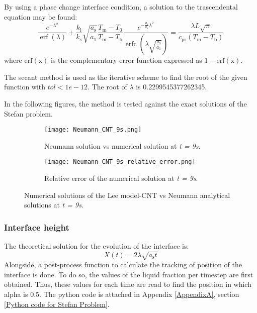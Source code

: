 By using a phase change interface condition, a solution to the trascendental equation may be found:
\begin{equation}
	\frac{e^{-\lambda^{2}}}{\operatorname{erf}(\lambda)}+\frac{k_{\mathrm{l}}}{k_{\mathrm{s}}} \sqrt{\frac{a_{\mathrm{s}}}{a_{1}}} \frac{T_{\mathrm{m}}-T_{0}}{T_{\mathrm{m}}-T_{\mathrm{b}}} \frac{e^{-\frac{a_{\mathrm{s}}}{a_{1}} \lambda^{2}}}{\operatorname{erfc}\left(\lambda \sqrt{\frac{a_{\mathrm{s}}}{a_{1}}}\right)}=\frac{\lambda L \sqrt{\pi}}{c_{\mathrm{ps}}\left(T_{\mathrm{m}}-T_{\mathrm{b}}\right)}
	\label{3.48}
\end{equation}
where ${\operatorname{erf(x)}}$ is the complementary error function expressed as $1-{\operatorname{erf(x)}}$.
	
\noindent The secant method is used as the iterative scheme to find the root of the given function with $tol<1e-12$. The root of $\lambda$ is 0.2299545377262345.

\noindent In the following figures, the method is tested against the exact solutions of the Stefan problem. 

\begin{figure}[h!]
	\begin{subfigure}{0.50\textwidth}
		\centering
		\texttt{[image: Neumann\_CNT\_9s.png]}\hfill
		\caption{Neumann solution vs numerical solution at \textit{t = 9s}.} \label{3.15figa}
	\end{subfigure}
	\hfill
	\begin{subfigure}{0.50\textwidth}
		\centering
		\texttt{[image: Neumann\_CNT\_9s\_relative\_error.png]}	
		\caption{Relative error of the numerical solution at \textit{t = 9s}.}\label{3.15figb}
	\end{subfigure}
	\caption{Numerical solutions of the Lee model-CNT vs Neumann analytical solutions at \textit{t = 9s}.}
	\label{3.15fig}
\end{figure}

\subsubsection{Interface height}

\setlength{\parindent}{0.5cm} The theoretical solution for the evolution of the interface is:
\begin{equation}
	X(t)=2 \lambda \sqrt{a_{\mathrm{s}} t}
	\label{3.49}
\end{equation}
Alongside, a post-process function to calculate the tracking of position of the interface is done. To do so, the values of the liquid fraction per timestep are first obtained. Thus, these values for each time are read to find the position in which alpha is 0.5. The python code is attached in Appendix \ref{AppendixA}, section \ref{Python code for Stefan Problem}.


